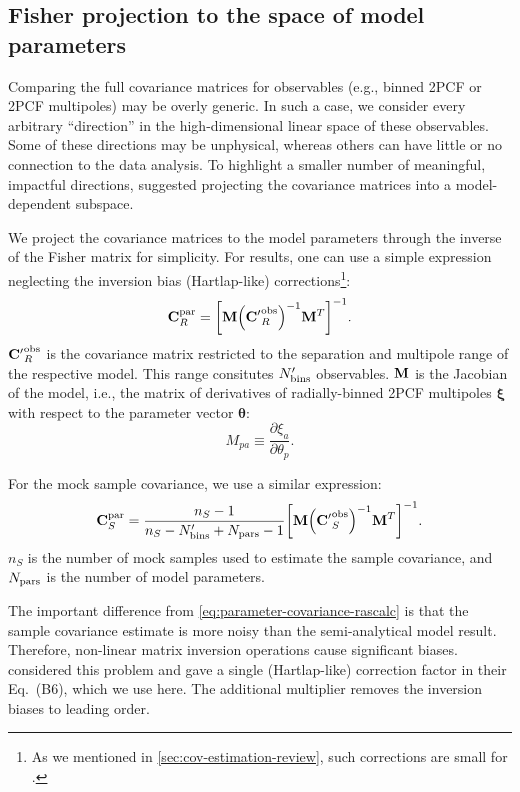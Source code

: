 \subsection{Fisher projection to the space of model parameters}
\label{sec:param-space-fisher}

Comparing the full covariance matrices for observables (e.g., binned 2PCF or 2PCF multipoles) may be overly generic.
In such a case, we consider every arbitrary ``direction'' in the high-dimensional linear space of these observables.
Some of these directions may be unphysical, whereas others can have little or no connection to the data analysis.
To highlight a smaller number of meaningful, impactful directions, \cite{subspace-projection,cov-comparison-projection} suggested projecting the covariance matrices into a model-dependent subspace.

We project the covariance matrices to the model parameters through the inverse of the Fisher matrix for simplicity.
For \rascalc{} results, one can use a simple expression neglecting the inversion bias (Hartlap-like) corrections\footnote{As we mentioned in \cref{sec:cov-estimation-review}, such corrections are small for \rascalc{}.}:
\begin{equation}
{\bf C}_R^{\rm par} = \qty[{\bf M} \qty({\bf C^\prime}^{\rm obs}_R)^{-1} {\bf M}^T]^{-1}. \label{eq:parameter-covariance-rascalc}
\end{equation}
${\bf C^\prime}^{\rm obs}_R$ is the \rascalc{} covariance matrix restricted to the separation and multipole range of the respective model.
This range consitutes $N^\prime_{\rm bins}$ observables.
${\bf M}$ is the Jacobian of the model, i.e., the matrix of derivatives of radially-binned 2PCF multipoles $\bm \xi$ with respect to the parameter vector $\bm \theta$:
\begin{equation}
M_{pa} \equiv \frac{\partial \xi_a}{\partial \theta_p}. \label{eq:model-jacobian}
\end{equation}

For the mock sample covariance, we use a similar expression:
\begin{equation}
{\bf C}_S^{\rm par} = \frac{n_S-1}{n_S-N^\prime_{\rm bins}+N_{\rm pars}-1} \qty[{\bf M} \qty({\bf C^\prime}^{\rm obs}_S)^{-1} {\bf M}^T]^{-1}.  \label{eq:parameter-covariance-sample}
\end{equation}
$n_S$ is the number of mock samples used to estimate the sample covariance, and $N_{\rm pars}$ is the number of model parameters.

The important difference from \cref{eq:parameter-covariance-rascalc} is that the sample covariance estimate is more noisy than the semi-analytical model result.
Therefore, non-linear matrix inversion operations cause significant biases.
\cite{density-split-clustering-constrain-nuLCDM} considered this problem and gave a single (Hartlap-like) correction factor in their Eq.~(B6), which we use here.
The additional multiplier removes the inversion biases to leading order.


